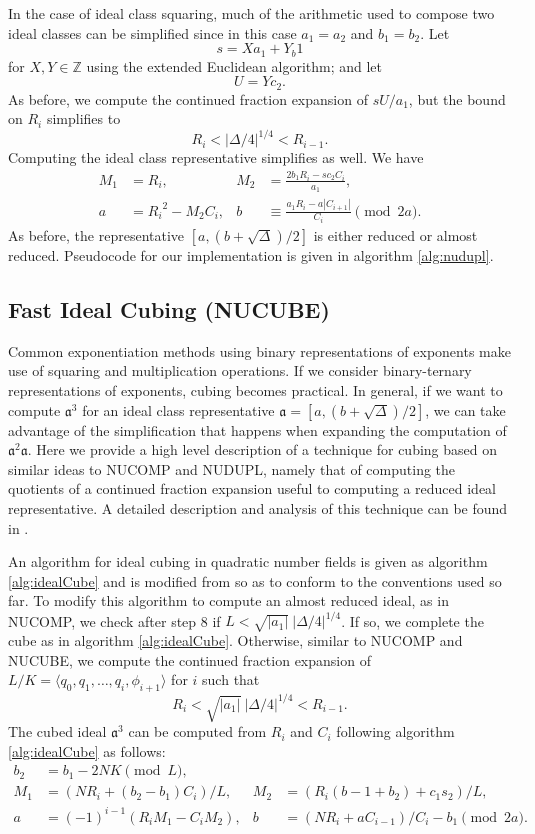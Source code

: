 \documentclass{ucalgthes1}
\theoremstyle{plain}
\theoremstyle{definition}
\newcommand{\ZZ}{\mathbb{Z}}
\begin{document}
In the case of ideal class squaring, much of the arithmetic used to compose two ideal classes can be simplified since in this case $a_1=a_2$ and $b_1=b_2$.  Let 
\[
	s = Xa_1 + Y_b1
\]
for $X,Y \in \ZZ$ using the extended Euclidean algorithm; and let 
\[
	U = Yc_2.
\]
As before, we compute the continued fraction expansion of $sU/a_1$, but the bound on $R_i$ simplifies to
\[
	R_i < |\Delta/4|^{1/4} < R_{i-1}.
\]
Computing the ideal class representative simplifies as well.  We have
\begin{align*}
	M_1 &= R_i, & 
	M_2 &= \frac{2b_1R_i - sc_2C_i}{a_1}, \\
	a &= {R_i}^2 - M_2C_i, &
	b &\equiv \frac{a_1 R_i - a |C_{i+1}|}{C_i} \pmod{2a}.
\end{align*}
As before, the representative $[a, (b+\sqrt\Delta)/2]$ is either reduced or almost reduced.  \break Pseudocode for our implementation is given in algorithm \ref{alg:nudupl}.


\subsection{Fast Ideal Cubing (NUCUBE)}

Common exponentiation methods using binary representations of exponents make use of squaring and multiplication operations.  If we consider binary-ternary representations of exponents, cubing becomes practical.  In general, if we want to compute ${\mathfrak a}^3$ for an ideal class representative $\mathfrak a = [a, (b+\sqrt\Delta)/2]$, we can take advantage of the simplification that happens when expanding the computation of ${\mathfrak a}^2 \mathfrak a$.  Here we provide a high level description of a technique for cubing based on similar ideas to NUCOMP and NUDUPL, namely that of computing the quotients of a continued fraction expansion useful to computing a reduced ideal representative.  A detailed description and analysis of this technique can be found in \cite{Ijs2010}.

An algorithm for ideal cubing in quadratic number fields is given as algorithm \ref{alg:idealCube} and is modified from \cite[Appendix A, Algorithm 5]{Ijs2010} so as to conform to the conventions used so far. To modify this algorithm to compute an almost reduced ideal, as in NUCOMP, we check after step 8 if $L < \sqrt{|a_1|} ~ |\Delta/4|^{1/4}$.  If so, we complete the cube as in algorithm \ref{alg:idealCube}.  Otherwise, similar to NUCOMP and NUCUBE, we compute the continued fraction expansion of $L/K = \langle q_0, q_1, \dots, q_i, \phi_{i+1}\rangle$ for $i$ such that
\[
	R_i < \sqrt{|a_1|} ~ |\Delta/4|^{1/4} < R_{i-1}.
\]
The cubed ideal ${\mathfrak a}^3$ can be computed from $R_i$ and $C_i$ following algorithm \ref{alg:idealCube} as follows:
\begin{align*}
	b_2 &= b_1 -2NK \pmod L, & \\
	M_1 &= (NR_i + (b_2-b_1)C_i)/L, &
	M_2 &= (R_i(b-1+b_2)+c_1s_2)/L, \\
	a &= (-1)^{i-1}(R_iM_1-C_iM_2), &
	b &= (NR_i + aC_{i-1})/C_i-b_1 \pmod {2a}.
\end{align*}
\end{document}
